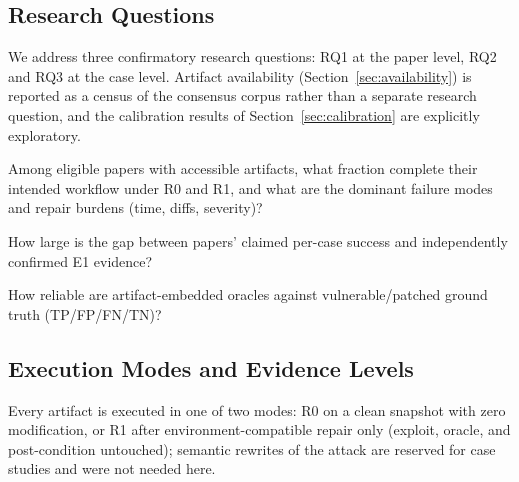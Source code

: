 \documentclass[11pt]{article}
\begin{document}
\subsection{Research Questions}
We address three confirmatory research questions: RQ1 at the paper level, RQ2 and RQ3 at the case level. Artifact availability (Section~\ref{sec:availability}) is reported as a census of the consensus corpus rather than a separate research question, and the calibration results of Section~\ref{sec:calibration} are explicitly exploratory.
\begin{description}[leftmargin=2.2em]
  \item[RQ1] Among eligible papers with accessible artifacts, what fraction complete their intended workflow under R0 and R1, and what are the dominant failure modes and repair burdens (time, diffs, severity)?
  \item[RQ2] How large is the gap between papers' claimed per-case success and independently confirmed E1 evidence?
  \item[RQ3] How reliable are artifact-embedded oracles against vulnerable/patched ground truth (TP/FP/FN/TN)?
\end{description}

\subsection{Execution Modes and Evidence Levels}
Every artifact is executed in one of two modes: R0 on a clean snapshot with zero modification, or R1 after environment-compatible repair only (exploit, oracle, and post-condition untouched); semantic rewrites of the attack are reserved for case studies and were not needed here. 
\end{document}
